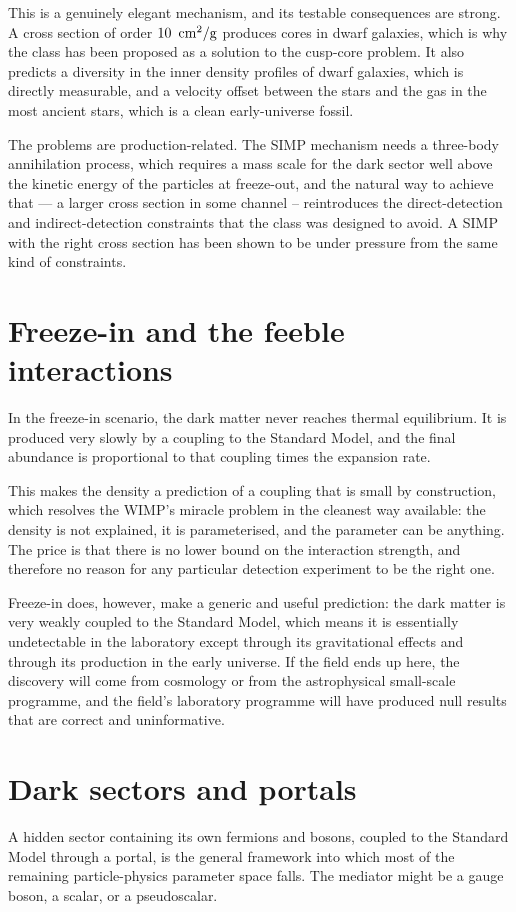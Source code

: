 This is a genuinely elegant mechanism, and its testable consequences are
strong. A cross section of order $10\ \cmtwo/\mathrm{g}$ produces cores in
dwarf galaxies, which is why the class has been proposed as a solution to
the cusp-core problem. It also predicts a diversity in the inner density
profiles of dwarf galaxies, which is directly measurable, and a velocity
offset between the stars and the gas in the most ancient stars, which is a
clean early-universe fossil.

The problems are production-related. The SIMP mechanism needs a
three-body annihilation process, which requires a mass scale for the
dark sector well above the kinetic energy of the particles at freeze-out,
and the natural way to achieve that --- a larger cross section in some
channel -- reintroduces the direct-detection and indirect-detection
constraints that the class was designed to avoid. A SIMP with the right
cross section has been shown to be under pressure from the same kind of
constraints.

\section{Freeze-in and the feeble interactions}In the freeze-in scenario, the dark
matter never reaches thermal equilibrium. It is produced very slowly by a
coupling to the Standard Model, and the final abundance is proportional to
that coupling times the expansion rate.

This makes the density a prediction of a coupling that is small by
construction, which resolves the WIMP's miracle problem in the cleanest way
available: the density is not explained, it is parameterised, and the
parameter can be anything. The price is that there is no lower bound on the
interaction strength, and therefore no reason for any particular detection
experiment to be the right one.

Freeze-in does, however, make a generic and useful prediction: the dark
matter is very weakly coupled to the Standard Model, which means it is
essentially undetectable in the laboratory except through its gravitational
effects and through its production in the early universe. If the field
ends up here, the discovery will come from cosmology or from the
astrophysical small-scale programme, and the field's laboratory programme
will have produced null results that are correct and uninformative.

\section{Dark sectors and portals}A hidden sector containing its own fermions and
bosons, coupled to the Standard Model through a portal, is the general
framework into which most of the remaining particle-physics parameter space
falls. The mediator might be a gauge boson, a scalar, or a pseudoscalar.

